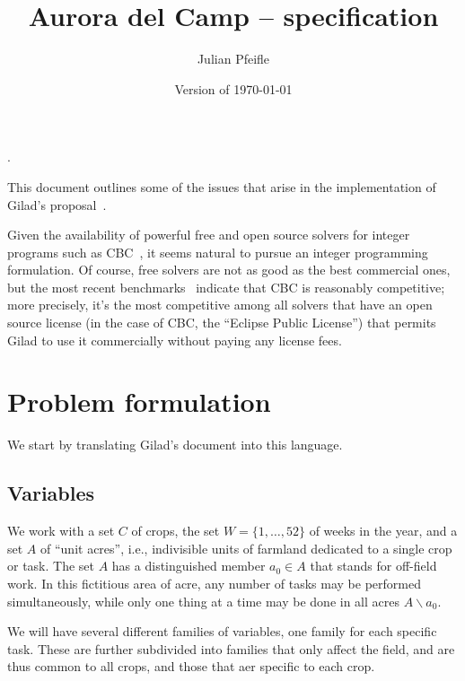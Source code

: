\documentclass[11pt]{amsart}
\begin{document}
\renewcommand*\descriptionlabel[1]{%
\hspace\labelsep\normalfont\itshape #1:}.

\title{Aurora del Camp -- specification}
\author{Julian Pfeifle}
\date{Version of \today}
\maketitle

This document outlines some of the issues that arise in the
implementation of Gilad's proposal~\cite{buzi11}.

\medskip
Given the availability of powerful free and open source solvers for
integer programs such as CBC~\cite{cbc}, it seems natural to pursue an
integer programming formulation. Of course, free solvers are not as
good as the best commercial ones, but the most recent
benchmarks~\cite{mittelmann11} indicate that CBC is reasonably
competitive; more precisely, it's the most competitive among all
solvers that have an open source license (in the case of CBC, the
``Eclipse Public License'') that permits Gilad to use it commercially
without paying any license fees.

\section{Problem formulation}

We start by translating Gilad's document into this language.

\subsection{Variables}

We work with a set $C$ of crops, the set $W=\{1,\dots,52\}$ of weeks
in the year, and a set $A$ of ``unit acres'', i.e., indivisible units
of farmland dedicated to a single crop or task. The set $A$ has a
distinguished member $a_0\in A$ that stands for off-field work. In
this fictitious area of acre, any number of tasks may be performed
simultaneously, while only one thing at a time may be done in all
acres $A\smallsetminus a_0$. 

We will have several different families of variables, one family for
each specific task. These are further subdivided into families that
only affect the field, and are thus common to all crops, and those
that aer specific to each crop.
\end{document}
